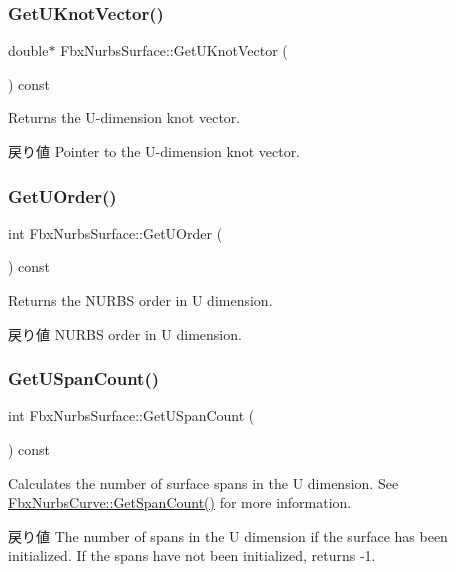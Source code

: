 \subsubsection{\texorpdfstring{Get\+U\+Knot\+Vector()}{GetUKnotVector()}}
{\footnotesize\ttfamily double$\ast$ Fbx\+Nurbs\+Surface\+::\+Get\+U\+Knot\+Vector (\begin{DoxyParamCaption}{ }\end{DoxyParamCaption}) const}

Returns the U-\/dimension knot vector. \begin{DoxyReturn}{戻り値}
Pointer to the U-\/dimension knot vector. 
\end{DoxyReturn}
\mbox{\label{class_fbx_nurbs_surface_ac085e8d245849e5864bf8fd192eeb62e}} 
\subsubsection{\texorpdfstring{Get\+U\+Order()}{GetUOrder()}}
{\footnotesize\ttfamily int Fbx\+Nurbs\+Surface\+::\+Get\+U\+Order (\begin{DoxyParamCaption}{ }\end{DoxyParamCaption}) const}

Returns the N\+U\+R\+BS order in U dimension. \begin{DoxyReturn}{戻り値}
N\+U\+R\+BS order in U dimension. 
\end{DoxyReturn}
\mbox{\label{class_fbx_nurbs_surface_af42bb32cacf0ceb7616db1a28e5b27e1}} 
\subsubsection{\texorpdfstring{Get\+U\+Span\+Count()}{GetUSpanCount()}}
{\footnotesize\ttfamily int Fbx\+Nurbs\+Surface\+::\+Get\+U\+Span\+Count (\begin{DoxyParamCaption}{ }\end{DoxyParamCaption}) const}

Calculates the number of surface spans in the U dimension. See \hyperlink{class_fbx_nurbs_curve_acb1cf2016f20b2a0c8df382046c7d3ea}{Fbx\+Nurbs\+Curve\+::\+Get\+Span\+Count()} for more information. \begin{DoxyReturn}{戻り値}
The number of spans in the U dimension if the surface has been initialized. If the spans have not been initialized, returns -\/1. 
\end{DoxyReturn}
\mbox{\label{class_fbx_nurbs_surface_aa726194cee04c25a68b695e5588d62eb}} 
